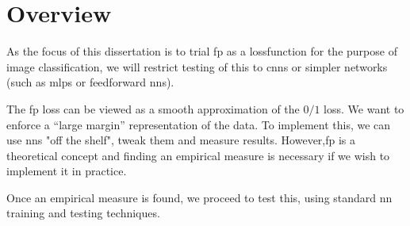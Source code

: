 \section{Overview}

As the focus of this dissertation is to trial \gls{fp} as a \gls{lossfunction} for the purpose of image classification, we will restrict testing of this to \gls{cnn}s or simpler networks (such as \gls{mlp}s or \gls{feedforward} \gls{nn}s). 
\bigskip

 The \gls{fp} loss can be viewed as a smooth approximation of the $0/1$ loss. We want to enforce a \enquote{large margin} representation of the data. To implement this, we can use  \gls{nn}s "off the shelf", tweak them and measure results. However,\gls{fp} is a theoretical concept and finding an empirical measure is necessary if we wish to implement it in practice. 
 \bigskip

Once an empirical measure is found, we proceed to test this, using standard \gls{nn} training and testing techniques.
\bigskip

